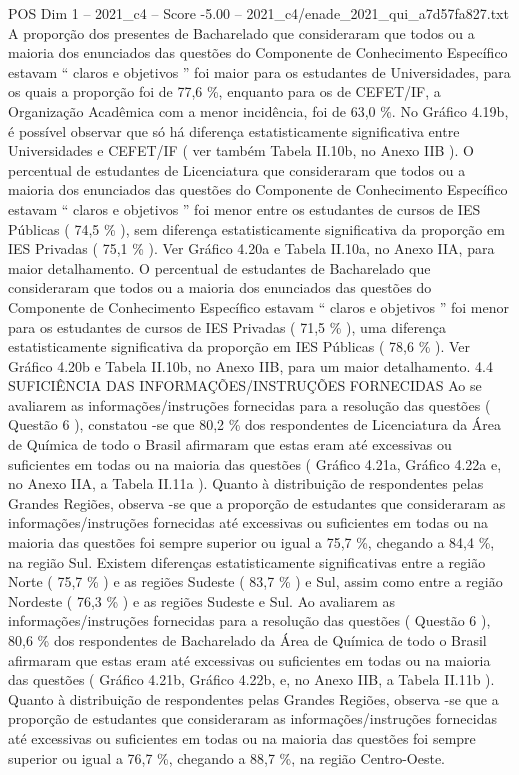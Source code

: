 \begin{textsample}{POS Dim 1 – 2021\_c4 – Score -5.00 – 2021\_c4/enade\_2021\_qui\_a7d57fa827.txt}
A proporção dos presentes de Bacharelado que consideraram que todos ou a maioria dos enunciados das questões do Componente de Conhecimento Específico estavam “ claros e objetivos ” foi maior para os estudantes de Universidades, para os quais a proporção foi de 77,6 \%, enquanto para os de CEFET/IF, a Organização Acadêmica com a menor incidência, foi de 63,0 \%.
No Gráfico 4.19b, é possível observar que só há diferença estatisticamente significativa entre Universidades e CEFET/IF ( ver também Tabela II.10b, no Anexo IIB ).
O percentual de estudantes de Licenciatura que consideraram que todos ou a maioria dos enunciados das questões do Componente de Conhecimento Específico estavam “ claros e objetivos ” foi menor entre os estudantes de cursos de IES Públicas ( 74,5 \% ), sem diferença estatisticamente significativa da proporção em IES Privadas ( 75,1 \% ).
Ver Gráfico 4.20a e Tabela II.10a, no Anexo IIA, para maior detalhamento.
O percentual de estudantes de Bacharelado que consideraram que todos ou a maioria dos enunciados das questões do Componente de Conhecimento Específico estavam “ claros e objetivos ” foi menor para os estudantes de cursos de IES Privadas ( 71,5 \% ), uma diferença estatisticamente significativa da proporção em IES Públicas ( 78,6 \% ).
Ver Gráfico 4.20b e Tabela II.10b, no Anexo IIB, para um maior detalhamento. 4.4 SUFICIÊNCIA DAS INFORMAÇÕES/INSTRUÇÕES FORNECIDAS Ao se avaliarem as informações/instruções fornecidas para a resolução das questões ( Questão 6 ), constatou -se que 80,2 \% dos respondentes de Licenciatura da Área de Química de todo o Brasil afirmaram que estas eram até excessivas ou suficientes em todas ou na maioria das questões ( Gráfico 4.21a, Gráfico 4.22a e, no Anexo IIA, a Tabela II.11a ).
Quanto à distribuição de respondentes pelas Grandes Regiões, observa -se que a proporção de estudantes que consideraram as informações/instruções fornecidas até excessivas ou suficientes em todas ou na maioria das questões foi sempre superior ou igual a 75,7 \%, chegando a 84,4 \%, na região Sul.
Existem diferenças estatisticamente significativas entre a região Norte ( 75,7 \% ) e as regiões Sudeste ( 83,7 \% ) e Sul, assim como entre a região Nordeste ( 76,3 \% ) e as regiões Sudeste e Sul.
Ao avaliarem as informações/instruções fornecidas para a resolução das questões ( Questão 6 ), 80,6 \% dos respondentes de Bacharelado da Área de Química de todo o Brasil afirmaram que estas eram até excessivas ou suficientes em todas ou na maioria das questões ( Gráfico 4.21b, Gráfico 4.22b, e, no Anexo IIB, a Tabela II.11b ).
Quanto à distribuição de respondentes pelas Grandes Regiões, observa -se que a proporção de estudantes que consideraram as informações/instruções fornecidas até excessivas ou suficientes em todas ou na maioria das questões foi sempre superior ou igual a 76,7 \%, chegando a 88,7 \%, na região Centro-Oeste.

\end{textsample}
